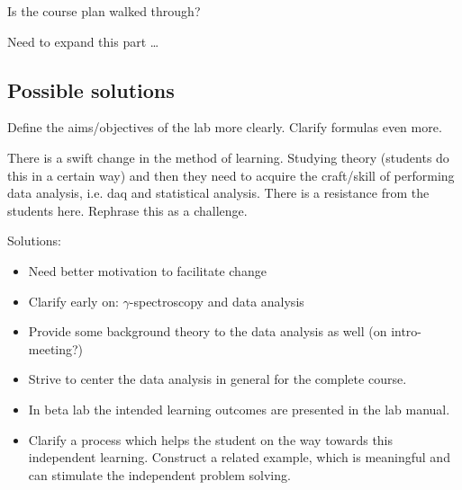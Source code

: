 \documentclass[]{article}
\begin{document}
Is the course plan walked through?

Need to expand this part \dots


\subsection{Possible solutions}
Define the aims/objectives of the lab more clearly. Clarify formulas even more.

There is a swift change in the method of learning.
Studying theory (students do this in a certain way) and then they need to acquire the craft/skill of performing data analysis, i.e. daq and statistical analysis.
There is a resistance from the students here.
Rephrase this as a challenge.

Solutions:
\begin{itemize}
  \item Need better motivation to facilitate change
  \item Clarify early on: $\gamma$-spectroscopy and data analysis
  \item Provide some background theory to the data analysis as well (on intro-meeting?)
  \item Strive to center the data analysis in general for the complete course.
  \item In beta lab the intended learning outcomes are presented in the lab manual.
  \item Clarify a process which helps the student on the way towards this independent learning. Construct a related example, which is meaningful and can stimulate the independent problem solving.
\end{itemize}
\end{document}
